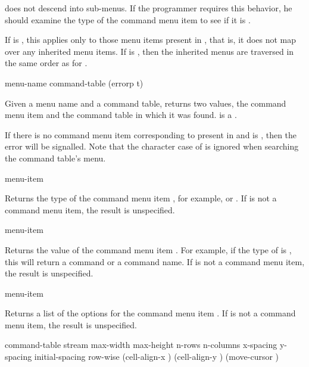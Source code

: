  does not descend into sub-menus.  If the
programmer requires this behavior, he should examine the type of the command
menu item to see if it is .

If  is , this applies  only to those
menu items present in , that is, it does not map over any
inherited menu items. If  is , then the inherited
menus are traversed in the same order as for
.


 {menu-name command-table \key (errorp t)}

Given a menu name and a command table, returns two values, the command menu
item and the command table in which it was found.   is a
.

\ReadOnly

If there is no command menu item corresponding to  present in
 and  is , then the
 error will be signalled.  Note that the character
case of  is ignored when searching the command table's menu.


 {menu-item}

Returns the type of the command menu item , for example,
 or .  If  is not a command menu item, the
result is unspecified.

 {menu-item}

Returns the value of the command menu item .  For example, if the
type of  is , this will return a command or a
command name.  If  is not a command menu item, the result is
unspecified.

 {menu-item}

Returns a list of the options for the command menu item .  If
 is not a command menu item, the result is unspecified.


 {command-table stream
                                          \key max-width max-height n-rows n-columns
                                               x-spacing y-spacing initial-spacing row-wise
                                               (cell-align-x ) (cell-align-y )
                                               (move-cursor )}

